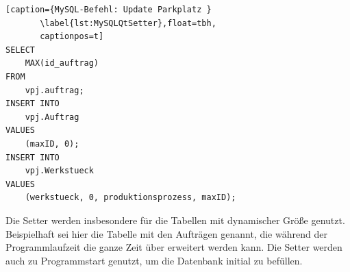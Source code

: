 

\begin{lstlisting}[caption={MySQL-Befehl: Update Parkplatz }
       \label{lst:MySQLQtSetter},float=tbh,
       captionpos=t]
SELECT
    MAX(id_auftrag)
FROM
    vpj.auftrag;
INSERT INTO
    vpj.Auftrag
VALUES 
    (maxID, 0);
INSERT INTO
    vpj.Werkstueck 
VALUES 
    (werkstueck, 0, produktionsprozess, maxID);
\end{lstlisting}
Die Setter werden insbesondere für die Tabellen mit dynamischer Größe genutzt. Beispielhaft sei hier die Tabelle mit den Aufträgen genannt, die während der Programmlaufzeit die ganze Zeit über erweitert werden kann. Die Setter werden auch zu Programmstart genutzt, um die Datenbank initial zu befüllen.